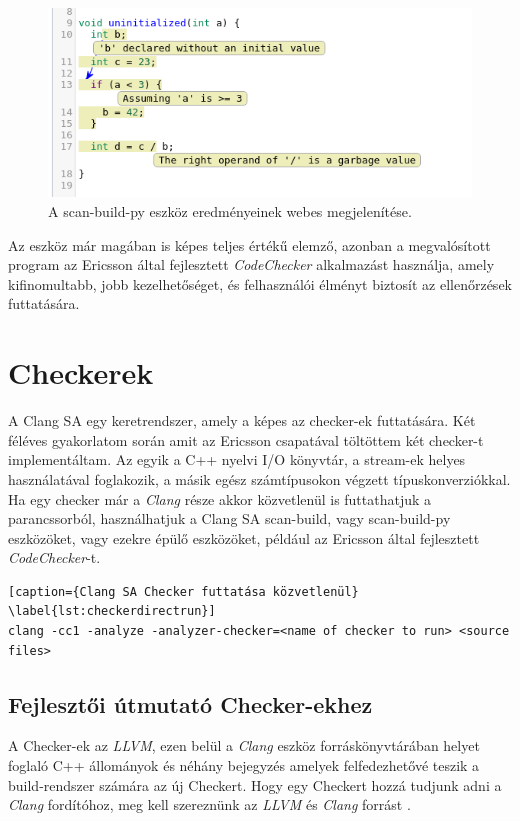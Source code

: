 \documentclass[a4paper,12pt]{report}
\begin{document}
\begin{figure}[h]
\caption{A scan-build-py eszköz eredményeinek webes megjelenítése.}
\centering
\includegraphics[scale=0.8]{uninit_web.png}
\end{figure}

Az eszköz már magában is képes teljes értékű elemző, azonban a megvalósított program az Ericsson által fejlesztett \emph{CodeChecker} \cite{codecheckergit} alkalmazást használja, amely kifinomultabb, jobb kezelhetőséget, és felhasználói élményt biztosít az ellenőrzések futtatására.

\chapter{Checkerek}
A Clang SA egy keretrendszer, amely a képes az checker-ek futtatására. Két féléves gyakorlatom során amit az Ericsson csapatával töltöttem két checker-t implementáltam. Az egyik a C++ nyelvi I/O könyvtár, a stream-ek helyes használatával foglakozik, a másik egész számtípusokon végzett típuskonverziókkal.
Ha egy checker már a \emph{Clang} része akkor közvetlenül is futtathatjuk a parancssorból, használhatjuk a Clang SA scan-build, vagy scan-build-py eszközöket, vagy ezekre épülő eszközöket, például az Ericsson által fejlesztett \emph{CodeChecker}-t.

\begin{lstlisting}[caption={Clang SA Checker futtatása közvetlenül}
\label{lst:checkerdirectrun}]
clang -cc1 -analyze -analyzer-checker=<name of checker to run> <source files>
\end{lstlisting}

\section{Fejlesztői útmutató Checker-ekhez}
A Checker-ek az \emph{LLVM}, ezen belül a \emph{Clang} eszköz forráskönyvtárában helyet foglaló C++ állományok és néhány bejegyzés amelyek felfedezhetővé teszik a build-rendszer számára az új Checkert. Hogy egy Checkert hozzá tudjunk adni a \emph{Clang} fordítóhoz, meg kell szereznünk az \emph{LLVM} és \emph{Clang} forrást \cite{getllvmpage}.
\end{document}
